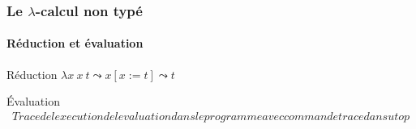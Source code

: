 \documentclass{beamer}
\newcommand{\Lam}[2]{\ensuremath{\lambda #1\: #2}}
\newcommand{\App}[2]{\ensuremath{#1\:#2}}
\newcommand{\Var}[1]{\ensuremath{#1}}
\newcommand{\subst}[3]{#1[#2 := #3]}
\begin{document}
\begin{frame}
\frametitle{Le $\lambda$-calcul non typé}
\framesubtitle{Réduction et évaluation}

\begin{block}{Réduction}
  $\App{\Lam{x}{x}}{t}\leadsto \subst{x}{x}{t} \leadsto \Var{t}$
\end{block}

\begin{block}{Évaluation}
  \begin{align*}
    Trace de lexecution de levaluation dans le programme
    avec commande trace dans utop
  \end{align*} 
\end{block}

\end{frame}
\end{document}
